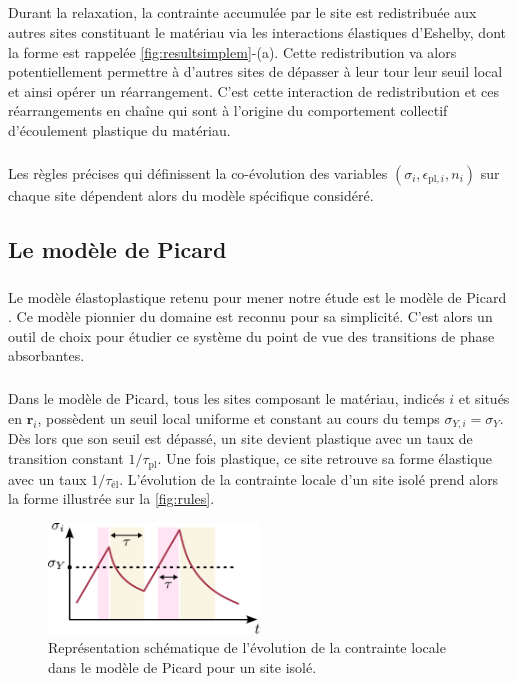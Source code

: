 \subparagraph{}Durant la relaxation, la contrainte accumulée par le site est redistribuée aux autres sites constituant le matériau via les interactions élastiques d'Eshelby, dont la forme est rappelée \autoref{fig:resultsimplem}-(a). Cette redistribution va alors potentiellement permettre à d'autres sites de dépasser à leur tour leur seuil local et ainsi opérer un réarrangement. C'est cette interaction de redistribution et ces réarrangements en chaîne qui sont à l'origine du comportement collectif d'écoulement plastique du matériau.

\subparagraph{}Les règles précises qui définissent la co-évolution des variables $(\sigma_i, \epsilon_{\text{pl},i}, n_i)$ sur chaque site dépendent alors du modèle spécifique considéré.

\subsection{Le modèle de Picard}

\subparagraph{}Le modèle élastoplastique retenu pour mener notre étude est le modèle de Picard \cite{picard_slow_2005}. Ce modèle pionnier du domaine est reconnu pour sa simplicité. C'est alors un outil de choix pour étudier ce système du point de vue des transitions de phase absorbantes.

\subparagraph{}Dans le modèle de Picard, tous les sites composant le matériau, indicés $i$ et situés en $\mathbf{r}_i$, possèdent un seuil local uniforme et constant au cours du temps $\sigma_{Y,i}=\sigma_Y$. Dès lors que son seuil est dépassé, un site devient plastique avec un taux de transition constant $1/\tau_ {\text{pl}}$. Une fois plastique, ce site retrouve sa forme élastique avec un taux $1/\tau_ {\text{él}}$. L'évolution de la contrainte locale d'un site isolé prend alors la forme illustrée sur la \autoref{fig:rules}.

\begin{figure}[h]
	\centering
	\includegraphics[width=0.5\textwidth]{Chapitre4/Figures/Methode/PicardTau.pdf}
	\caption{Représentation schématique de l'évolution de la contrainte locale dans le modèle de Picard pour un site isolé.}
	\label{fig:rules}
\end{figure}

